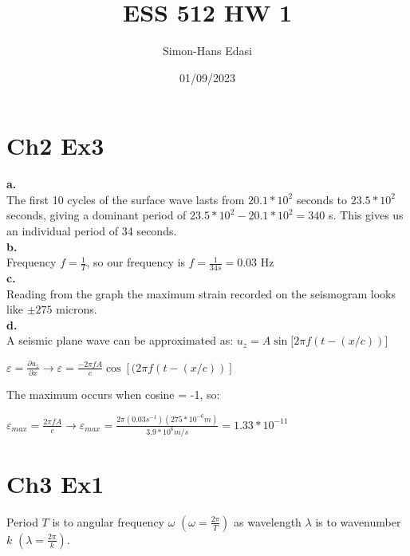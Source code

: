 \documentclass{article}
\title{ESS 512 HW 1}
\date{01/09/2023}
\author{Simon-Hans Edasi}
\begin{document}
	\maketitle



\section{Ch2 Ex3}
\textbf{a.} \\
The first 10 cycles of the surface wave lasts from $20.1 * 10^2$ seconds to $23.5*10^2$ seconds, giving a dominant period of $23.5 * 10^2 - 20.1 * 10^2 = 340$ s. This gives us an individual period of 34 seconds. \\

\textbf{b.} \\
Frequency $f = \frac{1}{T}$, so our frequency is $f = \frac{1}{34s} = 0.03$ Hz \\

\textbf{c.}\\
Reading from the graph the maximum strain recorded on the seismogram looks like $\pm{275}$ microns. \\

\textbf{d.}\\
A seismic plane wave can be approximated as: $u_{z} = A \sin[{2\pi f(t - (x / c))]}$ \\

\begin{center}

$
\varepsilon = \frac{\partial{u_z}}{\partial{x}} \rightarrow \varepsilon = \frac{- 2  \pi f A}{c}\cos \left[(2\pi f \left(t - \left(x / c\right)\right) \right]
$
\end{center}

The maximum occurs when cosine = -1, so:

\begin{center}
$
\varepsilon_{max} = \frac{2  \pi f A}{c} \rightarrow \varepsilon_{max} = \frac{2\pi \left( 0.03 s^{-1}\right)\left( 275 * 10^{-6} m\right)}{3.9 * 10^{6} m/s} = 1.33 * 10^{-11}
$
\end{center}





 



\section{Ch3 Ex1}
Period $T$ is to angular frequency $\omega$ $\left(\omega = \frac{2\pi}{T}\right)$ as wavelength $\lambda$ is to wavenumber $k$ $\left(\lambda = \frac{2\pi}{k}\right)$.
\end{document}
